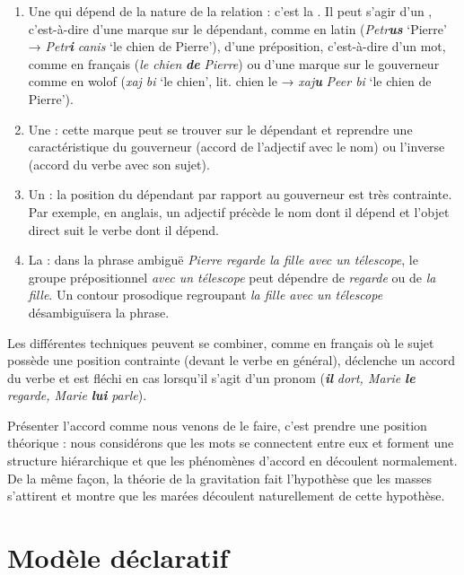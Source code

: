 {    \begin{enumerate}
    \item    Une  qui dépend de la nature de la relation : c’est la . Il peut s’agir d’un , c’est-à-dire d’une marque sur le dépendant, comme en latin (\textit{Petr}\textbf{\textit{us}} ‘Pierre’ \textrm{→} \textit{Petr}\textbf{\textit{i}} \textit{canis} ‘le chien de Pierre’), d’une préposition, c’est-à-dire d’un mot, comme en français (\textit{le chien} \textbf{\textit{de} }\textit{Pierre}) ou d’une marque sur le gouverneur comme en wolof (\textit{xaj bi} ‘le chien’, lit. chien le \textrm{→} \textit{xaj}\textbf{\textit{u}} \textit{Peer bi} ‘le chien de Pierre’).
    \item    Une  : cette marque peut se trouver sur le dépendant et reprendre une caractéristique du gouverneur (accord de l’adjectif avec le nom) ou l’inverse (accord du verbe avec son sujet).
    \item    Un  : la position du dépendant par rapport au gouverneur est très contrainte. Par exemple, en anglais, un adjectif précède le nom dont il dépend et l’objet direct suit le verbe dont il dépend.
    \item   La  : dans la phrase ambiguë \textit{Pierre regarde la fille avec un télescope}, le groupe prépositionnel \textit{avec un télescope} peut dépendre de \textit{regarde} ou de \textit{la fille}. Un contour prosodique regroupant \textit{la fille avec un télescope} désambiguïsera la phrase.
    \end{enumerate}
 

    Les différentes techniques peuvent se combiner, comme en français où le sujet possède une position contrainte (devant le verbe en général), déclenche un accord du verbe et est fléchi en cas lorsqu’il s’agit d’un pronom (\textbf{\textit{il}} \textit{dort, Marie} \textbf{\textit{le}} \textit{regarde, Marie} \textbf{\textit{lui}} \textit{parle}).

    Présenter l’accord comme nous venons de le faire, c’est prendre une position théorique : nous considérons que les mots se connectent entre eux et forment une structure hiérarchique et que les phénomènes d’accord en découlent normalement. De la même façon, la théorie de la gravitation fait l’hypothèse que les masses s’attirent et montre que les marées découlent naturellement de cette hypothèse.
}
\section{Modèle déclaratif}\label{sec:1.3.4}

